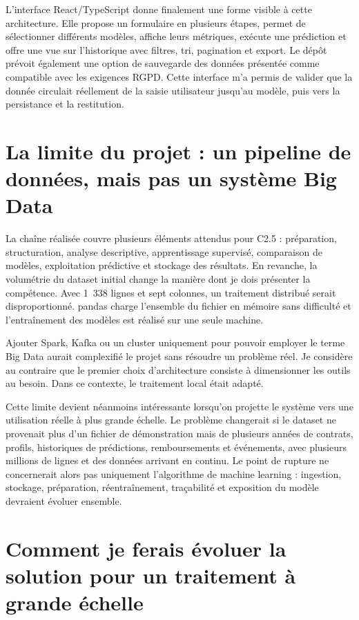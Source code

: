 L'interface React/TypeScript donne finalement une forme visible à cette architecture. Elle propose un formulaire en plusieurs étapes, permet de sélectionner différents modèles, affiche leurs métriques, exécute une prédiction et offre une vue sur l'historique avec filtres, tri, pagination et export. Le dépôt prévoit également une option de sauvegarde des données présentée comme compatible avec les exigences RGPD. Cette interface m'a permis de valider que la donnée circulait réellement de la saisie utilisateur jusqu'au modèle, puis vers la persistance et la restitution.

\section{La limite du projet : un pipeline de données, mais pas un système Big Data}

La chaîne réalisée couvre plusieurs éléments attendus pour C2.5 : préparation, structuration, analyse descriptive, apprentissage supervisé, comparaison de modèles, exploitation prédictive et stockage des résultats. En revanche, la volumétrie du dataset initial change la manière dont je dois présenter la compétence. Avec 1~338 lignes et sept colonnes, un traitement distribué serait disproportionné. pandas charge l'ensemble du fichier en mémoire sans difficulté et l'entraînement des modèles est réalisé sur une seule machine.

Ajouter Spark, Kafka ou un cluster uniquement pour pouvoir employer le terme \og Big Data \fg aurait complexifié le projet sans résoudre un problème réel. Je considère au contraire que le premier choix d'architecture consiste à dimensionner les outils au besoin. Dans ce contexte, le traitement local était adapté.

Cette limite devient néanmoins intéressante lorsqu'on projette le système vers une utilisation réelle à plus grande échelle. Le problème changerait si le dataset ne provenait plus d'un fichier de démonstration mais de plusieurs années de contrats, profils, historiques de prédictions, remboursements et événements, avec plusieurs millions de lignes et des données arrivant en continu. Le point de rupture ne concernerait alors pas uniquement l'algorithme de machine learning : ingestion, stockage, préparation, réentraînement, traçabilité et exposition du modèle devraient évoluer ensemble.

\section{Comment je ferais évoluer la solution pour un traitement à grande échelle}

